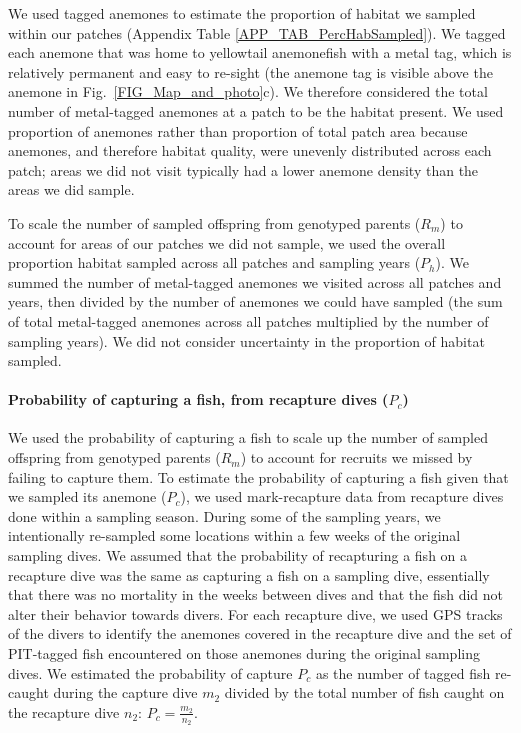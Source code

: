 \documentclass[12pt, oneside]{article}   	%
\begin{document}
We used tagged anemones to estimate the proportion of habitat we sampled within our patches (Appendix Table \ref{APP_TAB_PercHabSampled}). We tagged each anemone that was home to yellowtail anemonefish with a metal tag, which is relatively permanent and easy to re-sight (the anemone tag is visible above the anemone in Fig.\ \ref{FIG_Map_and_photo}c). We therefore considered the total number of metal-tagged anemones at a patch to be the habitat present. We used proportion of anemones rather than proportion of total patch area because anemones, and therefore habitat quality, were unevenly distributed across each patch; areas we did not visit typically had a lower anemone density than the areas we did sample. %

To scale the number of sampled offspring from genotyped parents ($R_m$) to account for areas of our patches we did not sample, we used the overall proportion habitat sampled across all patches and sampling years ($P_h$). We summed the number of metal-tagged anemones we visited across all patches and years, then divided by the number of anemones we could have sampled (the sum of total metal-tagged anemones across all patches multiplied by the number of sampling years). We did not consider uncertainty in the proportion of habitat sampled.

\paragraph*{Probability of capturing a fish, from recapture dives ($P_c$)} %

We used the probability of capturing a fish to scale up the number of sampled offspring from genotyped parents ($R_m$) to account for recruits we missed by failing to capture them. To estimate the probability of capturing a fish given that we sampled its anemone ($P_c$), we used mark-recapture data from recapture dives done within a sampling season. During some of the sampling years, we intentionally re-sampled some locations within a few weeks of the original sampling dives. We assumed that the probability of recapturing a fish on a recapture dive was the same as capturing a fish on a sampling dive, essentially that there was no mortality in the weeks between dives and that the fish did not alter their behavior towards divers. For each recapture dive, we used GPS tracks of the divers to identify the anemones covered in the recapture dive and the set of PIT-tagged fish encountered on those anemones during the original sampling dives. We estimated the probability of capture $P_c$ as the number of tagged fish re-caught during the capture dive $m_2$ divided by the total number of fish caught on the recapture dive $n_2$: $P_c = \frac{m_2}{n_2}$. %
\end{document}
